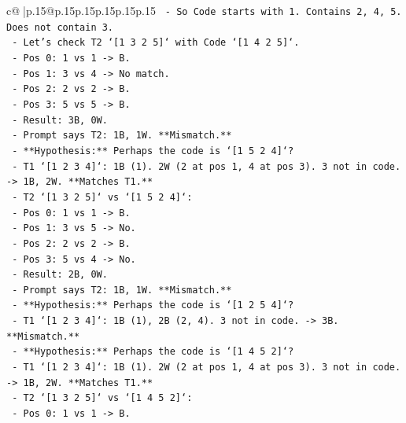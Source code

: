 \documentclass{article}
\begin{document}
{\begin{supertabular}{c@{$\;$}|p{.15\linewidth}@{}p{.15\linewidth}p{.15\linewidth}p{.15\linewidth}p{.15\linewidth}p{.15\linewidth}}
{{{\texttt{                {-} So Code starts with 1. Contains 2, 4, 5. Does not contain 3.} \\
\texttt{                {-} Let's check T2 `{[}1 3 2 5{]}` with Code `{[}1 4 2 5{]}`.} \\
\texttt{                  {-} Pos 0: 1 vs 1 {-}> B.} \\
\texttt{                  {-} Pos 1: 3 vs 4 {-}> No match.} \\
\texttt{                  {-} Pos 2: 2 vs 2 {-}> B.} \\
\texttt{                  {-} Pos 3: 5 vs 5 {-}> B.} \\
\texttt{                  {-} Result: 3B, 0W.} \\
\texttt{                  {-} Prompt says T2: 1B, 1W. **Mismatch.**} \\
\texttt{              {-} **Hypothesis:** Perhaps the code is `{[}1 5 2 4{]}`?} \\
\texttt{                {-} T1 `{[}1 2 3 4{]}`: 1B (1). 2W (2 at pos 1, 4 at pos 3). 3 not in code. {-}> 1B, 2W. **Matches T1.**} \\
\texttt{                {-} T2 `{[}1 3 2 5{]}` vs `{[}1 5 2 4{]}`:} \\
\texttt{                  {-} Pos 0: 1 vs 1 {-}> B.} \\
\texttt{                  {-} Pos 1: 3 vs 5 {-}> No.} \\
\texttt{                  {-} Pos 2: 2 vs 2 {-}> B.} \\
\texttt{                  {-} Pos 3: 5 vs 4 {-}> No.} \\
\texttt{                  {-} Result: 2B, 0W.} \\
\texttt{                  {-} Prompt says T2: 1B, 1W. **Mismatch.**} \\
\texttt{              {-} **Hypothesis:** Perhaps the code is `{[}1 2 5 4{]}`?} \\
\texttt{                {-} T1 `{[}1 2 3 4{]}`: 1B (1), 2B (2, 4). 3 not in code. {-}> 3B. **Mismatch.**} \\
\texttt{              {-} **Hypothesis:** Perhaps the code is `{[}1 4 5 2{]}`?} \\
\texttt{                {-} T1 `{[}1 2 3 4{]}`: 1B (1). 2W (2 at pos 1, 4 at pos 3). 3 not in code. {-}> 1B, 2W. **Matches T1.**} \\
\texttt{                {-} T2 `{[}1 3 2 5{]}` vs `{[}1 4 5 2{]}`:} \\
\texttt{                  {-} Pos 0: 1 vs 1 {-}> B.} \\
}}}
\end{supertabular}}
\end{document}
